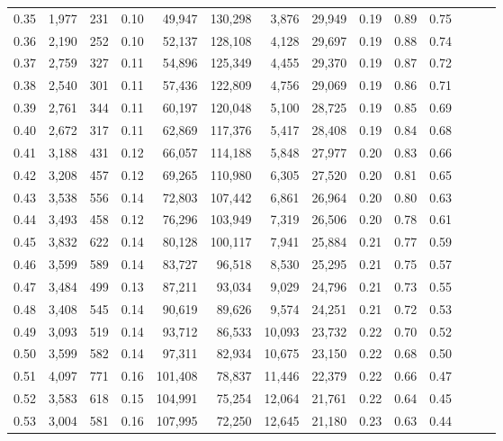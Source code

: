 \begin{tabular}{rrrrrrrrrrrrrr}
0.35 &  1,977 &  231 &  0.10 &   49,947 &  130,298 &   3,876 &  29,949 &  0.19 &  0.89 &      0.75 \\
0.36 &  2,190 &  252 &  0.10 &   52,137 &  128,108 &   4,128 &  29,697 &  0.19 &  0.88 &      0.74 \\
0.37 &  2,759 &  327 &  0.11 &   54,896 &  125,349 &   4,455 &  29,370 &  0.19 &  0.87 &      0.72 \\
0.38 &  2,540 &  301 &  0.11 &   57,436 &  122,809 &   4,756 &  29,069 &  0.19 &  0.86 &      0.71 \\
0.39 &  2,761 &  344 &  0.11 &   60,197 &  120,048 &   5,100 &  28,725 &  0.19 &  0.85 &      0.69 \\
0.40 &  2,672 &  317 &  0.11 &   62,869 &  117,376 &   5,417 &  28,408 &  0.19 &  0.84 &      0.68 \\
0.41 &  3,188 &  431 &  0.12 &   66,057 &  114,188 &   5,848 &  27,977 &  0.20 &  0.83 &      0.66 \\
0.42 &  3,208 &  457 &  0.12 &   69,265 &  110,980 &   6,305 &  27,520 &  0.20 &  0.81 &      0.65 \\
0.43 &  3,538 &  556 &  0.14 &   72,803 &  107,442 &   6,861 &  26,964 &  0.20 &  0.80 &      0.63 \\
0.44 &  3,493 &  458 &  0.12 &   76,296 &  103,949 &   7,319 &  26,506 &  0.20 &  0.78 &      0.61 \\
0.45 &  3,832 &  622 &  0.14 &   80,128 &  100,117 &   7,941 &  25,884 &  0.21 &  0.77 &      0.59 \\
0.46 &  3,599 &  589 &  0.14 &   83,727 &   96,518 &   8,530 &  25,295 &  0.21 &  0.75 &      0.57 \\
0.47 &  3,484 &  499 &  0.13 &   87,211 &   93,034 &   9,029 &  24,796 &  0.21 &  0.73 &      0.55 \\
0.48 &  3,408 &  545 &  0.14 &   90,619 &   89,626 &   9,574 &  24,251 &  0.21 &  0.72 &      0.53 \\
0.49 &  3,093 &  519 &  0.14 &   93,712 &   86,533 &  10,093 &  23,732 &  0.22 &  0.70 &      0.52 \\
0.50 &  3,599 &  582 &  0.14 &   97,311 &   82,934 &  10,675 &  23,150 &  0.22 &  0.68 &      0.50 \\
0.51 &  4,097 &  771 &  0.16 &  101,408 &   78,837 &  11,446 &  22,379 &  0.22 &  0.66 &      0.47 \\
0.52 &  3,583 &  618 &  0.15 &  104,991 &   75,254 &  12,064 &  21,761 &  0.22 &  0.64 &      0.45 \\
0.53 &  3,004 &  581 &  0.16 &  107,995 &   72,250 &  12,645 &  21,180 &  0.23 &  0.63 &      0.44 \\

\end{tabular}
